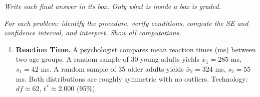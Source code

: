 \documentclass[10pt]{article}
\begin{document}
{\small\itshape Write each final answer in its box. Only what is inside a box is graded.}\par

\vspace{0.15in}

\textit{For each problem: identify the procedure, verify conditions, compute the SE and
confidence interval, and interpret. Show all computations.}

\begin{enumerate}

\item \textbf{Reaction Time.} \quad
A psychologist compares mean reaction times (ms) between two age groups. A random sample
of 30 young adults yields $\bar x_1 = 285$ ms, $s_1 = 42$ ms. A random sample of 35 older
adults yields $\bar x_2 = 324$ ms, $s_2 = 55$ ms. Both distributions are roughly symmetric
with no outliers. Technology: $df \approx 62$, $t^* \approx 2.000$ (95\%).


\end{enumerate}
\end{document}
